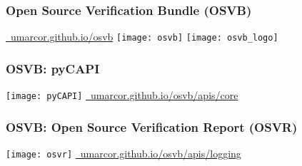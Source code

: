 \documentclass[xcolor={usenames,dvipsnames,svgnames}]{beamer}
\begin{document}
\begin{frame}
\frametitle{Open Source Verification Bundle (OSVB)}
\centering
\Large \href{https://umarcor.github.io/osvb}{\faBook~umarcor.github.io/osvb}
\vfill
\texttt{[image: osvb]}
\vfill
\texttt{[image: osvb\_logo]}
\end{frame}

\begin{frame}
\frametitle{OSVB: pyCAPI}
\centering
\vfill
\texttt{[image: pyCAPI]}
\vfill
\Large \href{https://umarcor.github.io/osvb/apis/core.html}{\faBook~umarcor.github.io/osvb/apis/core}
\vfill
\end{frame}

\begin{frame}
\frametitle{OSVB: Open Source Verification Report (OSVR)}
\centering
\hspace*{1cm}
\texttt{[image: osvr]}
\vfill
\Large \href{https://umarcor.github.io/osvb/apis/logging.html}{\faBook~umarcor.github.io/osvb/apis/logging}
\vfill
\end{frame}
\end{document}
